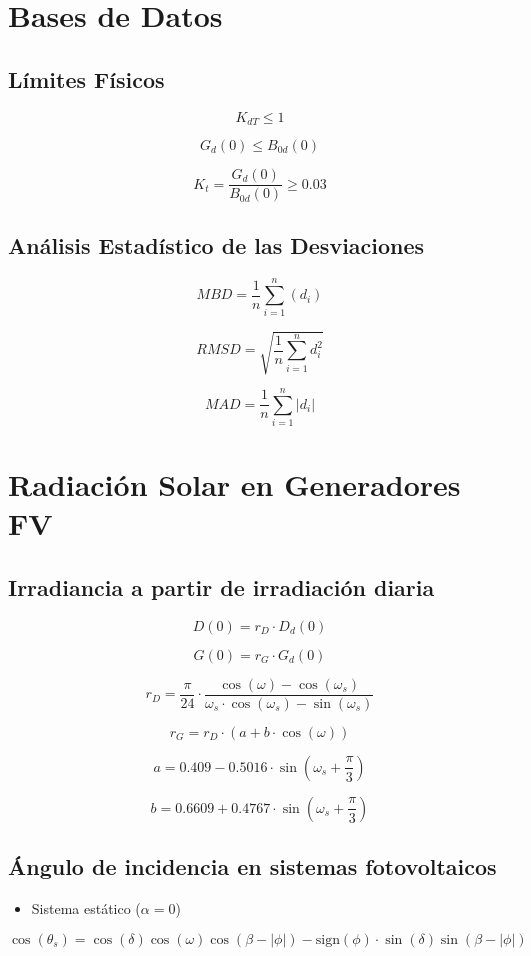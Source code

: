 \documentclass[article, a4paper]{memoir}
\begin{document}
\section{Bases de Datos}
\label{sec:org31f64a5}

\subsection{Límites Físicos}
\label{sec:orgcf83c54}

\[
  K_{dT} \leq 1
\]

\[
G_d(0) \leq B_{0d}(0)
\]

\[
K_t = \frac{G_d(0)}{B_{0d}(0)} \geq 0.03
\]

\subsection{Análisis Estadístico de las Desviaciones}
\label{sec:org7fccecb}

\[
MBD = \frac{1}{n} \sum_{i=1}^n (d_i)
\]

\[
RMSD = \sqrt{\frac{1}{n} \sum_{i=1}^n d_i^2} 
\]

\[
MAD = \frac{1}{n} \sum_{i=1}^n \left|d_i\right| 
\]
\section{Radiación Solar en Generadores FV}
\label{sec:org6143aed}
\subsection{Irradiancia a partir de irradiación diaria}
\label{sec:org4de016a}
\[D(0) = r_D \cdot D_{d}(0)\]

\[G(0) = r_G \cdot G_{d}(0)\]

\[
r_D = \frac{\pi}{24}\cdot\frac{\cos(\omega)-\cos(\omega_{s})}{\omega_{s}\cdot\cos(\omega_{s})-\sin(\omega_{s})}
\]

\[r_{G}=r_{D}\cdot\left(a+b\cdot\cos(\omega)\right)\]

\[a=0.409-0.5016\cdot\sin(\omega_{s}+\frac{\pi}{3})\]

\[b=0.6609+0.4767\cdot\sin(\omega_{s}+\frac{\pi}{3})\]
\subsection{Ángulo de incidencia en sistemas fotovoltaicos}
\label{sec:orgf83da1b}
\begin{itemize}
\item Sistema estático (\(\alpha=0\))
\end{itemize}
\[
\cos(\theta_{s}) = \cos(\delta)\cos(\omega)\cos(\beta-|\phi|)- \mathrm{sign}(\phi)\cdot\sin(\delta)\sin(\beta-|\phi|)
\]
\end{document}
